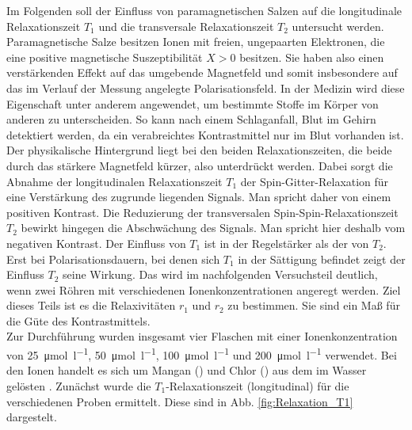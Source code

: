 \documentclass[../main.tex]{subfiles}
\begin{document}
    Im Folgenden soll der Einfluss von paramagnetischen Salzen auf die longitudinale Relaxationszeit $T_{1}$ und die transversale Relaxationszeit $T_{2}$ untersucht werden. Paramagnetische Salze besitzen Ionen mit freien, ungepaarten Elektronen, die eine positive magnetische Suszeptibilität $X > 0$ besitzen. Sie haben also einen verstärkenden Effekt auf das umgebende Magnetfeld und somit insbesondere auf das im Verlauf der Messung angelegte Polarisationsfeld. In der Medizin wird diese Eigenschaft unter anderem angewendet, um bestimmte Stoffe im Körper von anderen zu unterscheiden. So kann nach einem Schlaganfall, Blut im Gehirn detektiert werden, da ein verabreichtes Kontrastmittel nur im Blut vorhanden ist. Der physikalische Hintergrund liegt bei den beiden Relaxationszeiten, die beide durch das stärkere Magnetfeld kürzer, also unterdrückt werden. Dabei sorgt die Abnahme der longitudinalen Relaxationszeit $T_{1}$ der Spin-Gitter-Relaxation für eine Verstärkung des zugrunde liegenden Signals. Man spricht daher von einem positiven Kontrast. Die Reduzierung der transversalen Spin-Spin-Relaxationszeit $T_{2}$ bewirkt hingegen die Abschwächung des Signals. Man spricht hier deshalb vom negativen Kontrast. Der Einfluss von $T_{1}$ ist in der Regelstärker als der von $T_{2}$. Erst bei Polarisationsdauern, bei denen sich $T_{1}$ in der Sättigung befindet zeigt der Einfluss $T_{2}$ seine Wirkung. Das wird im nachfolgenden Versuchsteil deutlich, wenn zwei Röhren mit verschiedenen Ionenkonzentrationen angeregt werden. Ziel dieses Teils ist es die Relaxivitäten $r_{1}$ und $r_{2}$ zu bestimmen. Sie sind ein Maß für die Güte des Kontrastmittels. \\
    Zur Durchführung wurden insgesamt vier Flaschen mit einer Ionenkonzentration von \SI{25}{\micro \mol \per \litre}, \SI{50}{\micro \mol \per \litre}, \SI{100}{\micro \mol \per \litre} und \SI{200}{\micro \mol \per \litre} verwendet. Bei den Ionen handelt es sich um Mangan () und Chlor () aus dem im Wasser gelösten . Zunächst wurde die $T_{1}$-Relaxationszeit (longitudinal) für die verschiedenen Proben ermittelt. Diese sind in Abb. \ref{fig:Relaxation_T1} dargestelt.
\end{document}

